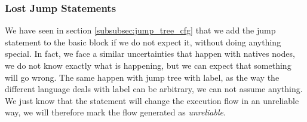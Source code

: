 \subsubsection{Lost Jump Statements}
\label{subsubsec:lost_jump_statement}

We have seen in section \ref{subsubsec:jump_tree_cfg} that we add the jump statement to the basic block if we do not expect it, without doing anything special.
In fact, we face a similar uncertainties that happen with natives nodes, we do not know exactly what is happening, but we can expect that something will go wrong. 
The same happen with jump tree with label, as the way the different language deals with label can be arbitrary, we can not assume anything. 
We just know that the statement will change the execution flow in an unreliable way, we will therefore mark the flow generated as \emph{unreliable}.

